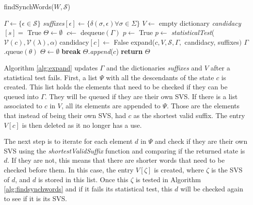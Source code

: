 {\begin{algorithm} 
  \caption{findSynchWords($W, \mathcal{S}$)\label{alg:findsynchwords}}
    \begin{algorithmic}[1]
      	\State $\Gamma \gets \{\epsilon \in \mathcal{S}\}$ 
        \State \textit{suffixes}$[\epsilon ] \gets \{\delta (\sigma , \epsilon) \forall \sigma \in \Sigma \}$
        \State $V \gets$ empty dictionary
        	\State \textit{candidacy}$[s] = $ True
        \EndFor
        \State $\Theta \gets \emptyset$ 
      \EndProcedure	
      	\While{$\Gamma \neq \emptyset$}
        	\State $\textit{c} \leftarrow$ dequeue$(\Gamma)$
        		\State $p \leftarrow$ True
        		\If {$\Lambda \neq \emptyset$}
        				\State $p \leftarrow$ \textit{statisticalTest}($\mathcal{V}(c), \mathcal{V}(\lambda), \alpha)$
        					\State candidacy$[c] \gets$ False
        					\State expand($c, V, \mathcal{S}, \Gamma,$ candidacy, suffixes$)$
        						\State $\Gamma$.queue$(\theta)$
        					\EndFor
        					\State $\Theta \leftarrow \emptyset$
        					\State \textbf{break}
        				\EndIf
        			\EndFor
        		\EndIf
        			\State $\Theta$.\textit{append}($c$)
        		\EndIf
        	\EndIf
      	\EndWhile
      	\State \textbf{return} $\Theta$
      \EndProcedure
    \end{algorithmic}
  \end{algorithm}
  
Algorithm \ref{alg:expand} updates $\Gamma$ and the dictionaries \textit{suffixes} and $V$ after a statistical test fails. First, a list $\Psi$ with all the descendants of the state $c$ is created. This list holds the elements that need to be checked if they can be queued into $\Gamma$. They will be queued if they are their own SVS. If there is a list associated to $c$ in $V$, all its elements are appended to $\Psi$. Those are the elements that instead of being their own SVS, had $c$ as the shortest valid suffix. The entry $V[c]$ is then deleted as it no longer has a use.

The next step is to iterate for each element $d$ in $\Psi$ and check if they are their own SVS using the \textit{shortestValidSuffix} function and comparing if the returned state is $d$. If they are not, this means that there are shorter words that need to be checked before them. In this case, the entry $V[\zeta]$ is created, where $\zeta$ is the SVS of $d$, and $d$ is stored in this list. Once this $\zeta$ is tested in Algorithm \ref{alg:findsynchwords} and if it fails its statistical test, this $d$ will be checked again to see if it is its SVS.

}
